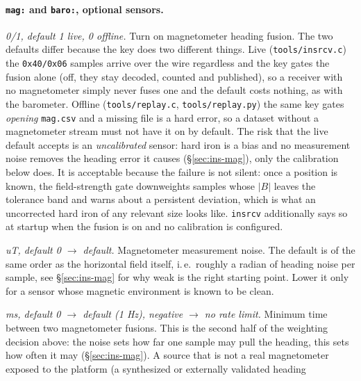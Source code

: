 \documentclass[11pt,a4paper]{article}
\newcommand{\code}[1]{\texttt{#1}}
\begin{document}
\paragraph{\code{mag:} and \code{baro:}, optional sensors.}
\begin{description}\setlength\itemsep{0pt}
  \item[\code{mag: enable}] \emph{0/1, default 1 live, 0 offline.} Turn on
      magnetometer heading fusion. The two defaults differ because the key
      does two different things. Live (\code{tools/insrcv.c}) the
      \code{0x40/0x06} samples arrive over the wire regardless and the key
      gates the fusion alone (off, they stay decoded, counted and
      published), so a receiver with no magnetometer simply never fuses one
      and the default costs nothing, as with the barometer. Offline
      (\code{tools/replay.c}, \code{tools/replay.py}) the same key gates
      \emph{opening} \code{mag.csv} and a missing file is a hard error, so
      a dataset without a magnetometer stream must not have it on by
      default. The risk that the live default accepts is an \emph{uncalibrated}
      sensor: hard iron is a bias and no measurement noise removes the
      heading error it causes (\S\ref{sec:ins-mag}), only the
      calibration below does. It is acceptable because the failure is not
      silent: once a position is known, the field-strength gate
      downweights samples whose $|B|$ leaves the tolerance band and warns
      about a persistent deviation, which is what an uncorrected hard iron
      of any relevant size looks like. \code{insrcv} additionally says so
      at startup when the fusion is on and no calibration is configured.
  \item[\code{mag: stddev\_\allowbreak{}ut}] \emph{uT, default 0 $\to$ default.} Magnetometer
    measurement noise. The default is of the same order as the horizontal
    field itself, i.\,e.\ roughly a radian of heading noise per sample, see
    \S\ref{sec:ins-mag} for why weak is the right starting point. Lower it
    only for a sensor whose magnetic environment is known to be clean.
  \item[\code{mag: min\_\allowbreak{}delay\_\allowbreak{}ms}] \emph{ms, default 0 $\to$ default (1 Hz),
    negative $\to$ no rate limit.} Minimum time between two magnetometer
    fusions. This is the second half of the weighting decision above: the noise
    sets how far one sample may pull the heading, this sets how often it
    may (\S\ref{sec:ins-mag}). A source that is not a real magnetometer
    exposed to the platform (a synthesized or externally validated heading

\end{description}
\end{document}
